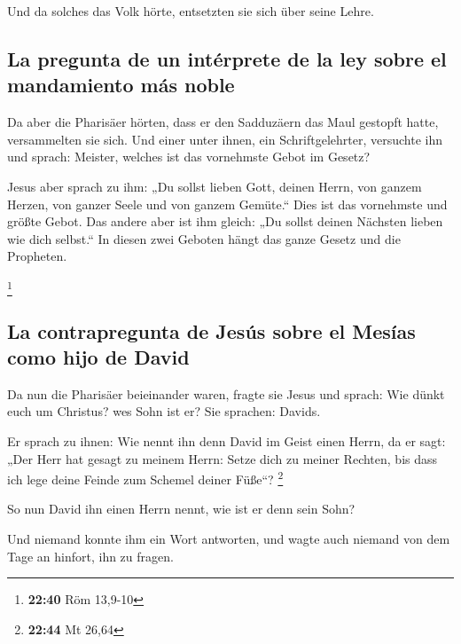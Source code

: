  Und da solches das Volk hörte, entsetzten sie sich über
seine Lehre.

\hypertarget{la-pregunta-de-un-intuxe9rprete-de-la-ley-sobre-el-mandamiento-muxe1s-noble}{%
\subsection{La pregunta de un intérprete de la ley sobre el mandamiento
más
noble}\label{la-pregunta-de-un-intuxe9rprete-de-la-ley-sobre-el-mandamiento-muxe1s-noble}}

 Da aber die Pharisäer hörten, dass er den Sadduzäern das
Maul gestopft hatte, versammelten sie sich.  Und einer
unter ihnen, ein Schriftgelehrter, versuchte ihn und sprach:
 Meister, welches ist das vornehmste Gebot im Gesetz?

 Jesus aber sprach zu ihm: „Du sollst lieben Gott, deinen
Herrn, von ganzem Herzen, von ganzer Seele und von ganzem Gemüte.``
 Dies ist das vornehmste und größte Gebot.
 Das andere aber ist ihm gleich: „Du sollst deinen
Nächsten lieben wie dich selbst.``  In diesen zwei
Geboten hängt das ganze Gesetz und die Propheten.

\footnote{\textbf{22:40} Röm 13,9-10}

\hypertarget{la-contrapregunta-de-jesuxfas-sobre-el-mesuxedas-como-hijo-de-david}{%
\subsection{La contrapregunta de Jesús sobre el Mesías como hijo de
David}\label{la-contrapregunta-de-jesuxfas-sobre-el-mesuxedas-como-hijo-de-david}}

 Da nun die Pharisäer beieinander waren, fragte sie Jesus
 und sprach: Wie dünkt euch um Christus? wes Sohn ist er?
Sie sprachen: Davids.

 Er sprach zu ihnen: Wie nennt ihn denn David im Geist
einen Herrn, da er sagt:  „Der Herr hat gesagt zu meinem
Herrn: Setze dich zu meiner Rechten, bis dass ich lege deine Feinde zum
Schemel deiner Füße``? \footnote{\textbf{22:44} Mt 26,64}

 So nun David ihn einen Herrn nennt, wie ist er denn sein
Sohn?

 Und niemand konnte ihm ein Wort antworten, und wagte
auch niemand von dem Tage an hinfort, ihn zu fragen.

